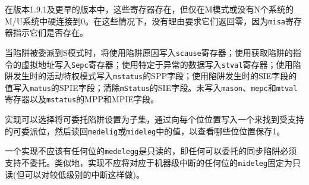 \begin{commentary}
 在版本1.9.1及更早的版本中，这些寄存器存在，但仅在M模式或没有N个系统的M/U系统中硬连接到0。在这些情况下，没有理由要求它们返回零，因为{\tt misa}寄存器指示它们是否存在。
\end{commentary}

\iffalse
When a trap is delegated to S-mode, the
{\tt scause} register is written with the trap cause; the
{\tt sepc} register is written with the virtual address of
the instruction that took the trap; the
{\tt stval} register is written with an
exception-specific datum; the SPP field
of {\tt mstatus} is written with the active privilege mode at the time of
the trap; the SPIE field of {\tt mstatus} is written with the
value of the SIE field at the time of the trap; and
the SIE field of {\tt mstatus} is cleared.
The {\tt mcause}, {\tt mepc}, and {\tt mtval} registers and the MPP and
MPIE fields of {\tt mstatus} are not written.

An
implementation can choose to subset the delegatable traps, with the
supported delegatable bits found by writing one to every bit location,
then reading back the value in {\tt medeleg} or {\tt mideleg} to see
which bit positions hold a one.

An implementation shall not have any bits of {\tt medeleg} be read-only one, i.e.,
any synchronous trap that can be delegated must support not being delegated.
Similarly, an implementation shall not fix as read-only one any bits of
{\tt mideleg} corresponding to machine-level interrupts (but may do so
for lower-level interrupts).
\fi

当陷阱被委派到S模式时，将使用陷阱原因写入{\tt scause}寄存器；使用获取陷阱的指令的虚拟地址写入{\tt Sepc}寄存器；使用特定于异常的数据写入{\tt stval}寄存器；使用陷阱发生时的活动特权模式写入{\tt mstatus}的SPP字段；使用陷阱发生时的SIE字段的值写入{\tt matus}的SPIE字段；清除{\tt mStatus}的SIE字段。未写入{\tt mason}、{\tt mepc}和{\tt mtval}寄存器以及{\tt mstatus}的MPP和MPIE字段。

实现可以选择将可委托陷阱设置为子集，通过向每个位位置写入一个来找到受支持的可委派位，然后读回{\tt medelig}或{\tt mideleg}中的值，以查看哪些位位置保存1。

一个实现不应该有任何位的{\tt medelegg}是只读的，即任何可以委托的同步陷阱必须支持不委托。类似地，实现不应将对应于机器级中断的任何位的{\tt mideleg}固定为只读(但可以对较低级别的中断这样做)。

\iffalse
\begin{commentary}
Version 1.11 and earlier prohibited having any bits of {\tt mideleg}
be read-only one.
Platform standards may always add such restrictions.
\end{commentary}
\fi

